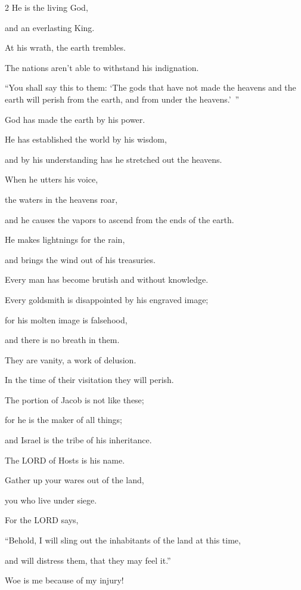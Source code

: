 \begin{multicols}{2}
	He is the living God,
	
	and an everlasting King.
	
	At his wrath, the earth trembles.
	
	The nations aren’t able to withstand his indignation.
	
	
	\myverse{}“You shall say this to them: ‘The gods that have not made the
	heavens and the earth will perish from the earth, and from under the heavens.’ ”
	
	
	\myverse{}God has made the earth by his power.
	
	He has established the world by his wisdom,
	
	and by his understanding has he stretched out the heavens.
	
	
	\myverse{}When he utters his voice,
	
	the waters in the heavens roar,
	
	and he causes the vapors to ascend from the ends of the earth.
	
	He makes lightnings for the rain,
	
	and brings the wind out of his treasuries.
	
	
	\myverse{}Every man has become brutish and without knowledge.
	
	Every goldsmith is disappointed by his engraved image;
	
	for his molten image is falsehood,
	
	and there is no breath in them.
	
	
	\myverse{}They are vanity, a work of delusion.
	
	In the time of their visitation they will perish.
	
	
	\myverse{}The portion of Jacob is not like these;
	
	for he is the maker of all things;
	
	and Israel is the tribe of his inheritance.
	
	The LORD of Hosts is his name.
	
	
	\myverse{}Gather up your wares out of the land,
	
	you who live under siege.
	
	
	\myverse{}For the LORD says,
	
	
	“Behold, I will sling out the inhabitants of the land at this time,
	
	and will distress them, that they may feel it.”
	
	
	\myverse{}Woe is me because of my injury!
	

\end{multicols}
